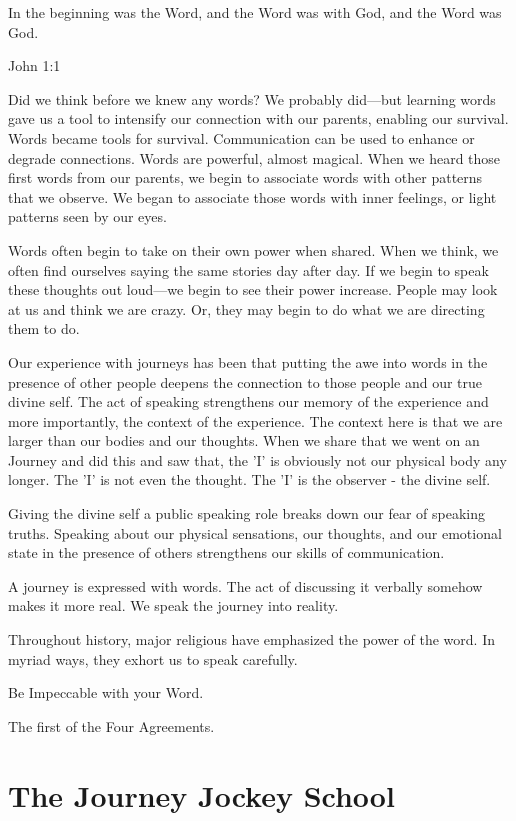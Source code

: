 \documentclass[12pt]{book}
\begin{document}
\epigraph{
In the beginning was the Word, and the Word was with God,
  and the Word was God.}{John 1:1}


Did we think before we knew any words? We probably did---but learning
words gave us a tool to intensify our connection with our parents,
enabling our survival. Words became tools for survival. Communication
can be used to enhance or degrade connections. Words
are powerful, almost magical. When we heard those first words from our
parents, we begin to associate words with other patterns that we
observe. We began to associate those words with inner feelings, or
light patterns seen by our eyes.



Words often begin to take on their own power when shared. When we
think, we often find ourselves saying the same stories day after
day. If we begin to speak these thoughts out loud---we begin to see
their power increase. People may look at us and think we are
crazy. Or, they may begin to do what we are directing them to do.

Our experience with journeys has been that putting the awe into words
in the presence of other people deepens the connection to those people
and our true divine self. The act of speaking strengthens our memory of
the experience and more importantly, the context of the
experience. The context here is that we are larger than our bodies and
our thoughts. When we share that we went on an Journey and did this and saw
that, the 'I' is obviously not our physical body any longer. The 'I'
is not even the thought. The 'I' is the observer - the divine self.

Giving the divine self a public speaking role breaks down our fear of
speaking truths. Speaking about our physical sensations, our thoughts,
and our emotional state in the presence of others strengthens our
skills of communication.

A journey is expressed with words. The act of discussing it verbally
somehow makes it more real. We speak the journey into reality.
					
Throughout history, major religious have emphasized the power of the
word. In myriad ways, they exhort us to speak carefully.
\epigraph{
Be Impeccable with your Word.
}{The first of the Four
  Agreements.\cite{ruiz2010four}}


\chapter{The Journey Jockey School}
\end{document}
